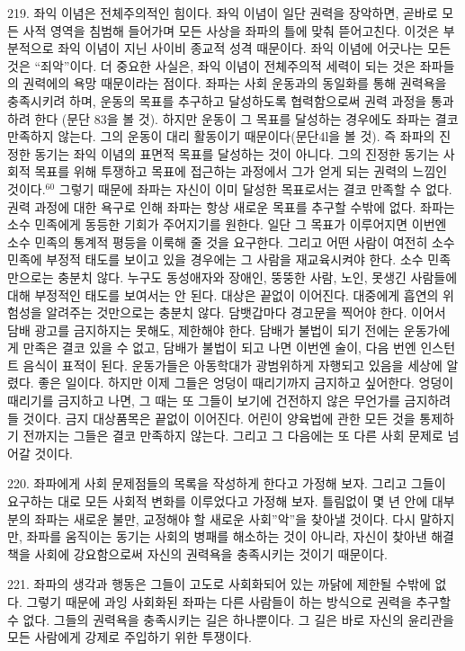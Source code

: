 \documentclass[11pt,a4paper]{article}
\begin{document}
\begin{multicols}{2}
219. 좌익 이념은 전체주의적인 힘이다. 좌익 이념이 일단 권력을 장악하면, 곧바로 모든 사적 영역을  침범해 들어가며 모든 사상을 좌파의 틀에 맞춰 뜯어고친다. 이것은 부분적으로 좌익 이념이 지닌 사이비  종교적 성격 때문이다. 좌익 이념에 어긋나는 모든 것은 “죄악”이다. 더 중요한 사실은, 좌익 이념이  전체주의적 세력이 되는 것은 좌파들의 권력에의 욕망 때문이라는 점이다. 좌파는 사회 운동과의  동일화를 통해 권력욕을 충족시키려 하며, 운동의 목표를 추구하고 달성하도록 협력함으로써 권력  과정을 통과하려 한다 (문단 83을 볼 것). 하지만 운동이 그 목표를 달성하는 경우에도 좌파는 결코 만족하지 않는다. 그의 운동이 대리 활동이기 때문이다(문단4l을 볼 것). 즉 좌파의 진정한 동기는 좌익 이념의 표면적 목표를 달성하는 것이 아니다. 그의 진정한 동기는 사회적 목표를 위해 투쟁하고 목표에  접근하는 과정에서 그가 얻게 되는 권력의 느낌인 것이다.\hyperlink{60}{$^{60}$} 그렇기 때문에 좌파는 자신이 이미 달성한  목표로서는 결코 만족할 수 없다. 권력 과정에 대한 욕구로 인해 좌파는 항상 새로운 목표를 추구할  수밖에 없다. 좌파는 소수 민족에게 동등한 기회가 주어지기를 원한다. 일단 그 목표가 이루어지면 이번엔 소수 민족의 통계적 평등을 이룩해 줄 것을 요구한다. 그리고 어떤 사람이 여전히 소수 민족에 부정적  태도를 보이고 있을 경우에는 그 사람을 재교육시켜야 한다. 소수 민족만으로는 충분치 않다. 누구도  동성애자와 장애인, 뚱뚱한 사람, 노인, 못생긴 사람들에 대해 부정적인 태도를 보여서는 안 된다. 대상은  끝없이 이어진다. 대중에게 흡연의 위험성을 알려주는 것만으로는 충분치 않다. 담뱃갑마다 경고문을  찍어야 한다. 이어서 담배 광고를 금지하지는 못해도, 제한해야 한다. 담배가 불법이 되기 전에는  운동가에게 만족은 결코 있을 수 없고, 담배가 불법이 되고 나면 이번엔 술이, 다음 번엔 인스턴트 음식이  표적이 된다. 운동가들은 아동학대가 광범위하게 자행되고 있음을 세상에 알렸다. 좋은 일이다. 하지만  이제 그들은 엉덩이 때리기까지 금지하고 싶어한다. 엉덩이 때리기를 금지하고 나면, 그 때는 또 그들이  보기에 건전하지 않은 무언가를 금지하려 들 것이다. 금지 대상품목은 끝없이 이어진다. 어린이 양육법에  관한 모든 것을 통제하기 전까지는 그들은 결코 만족하지 않는다. 그리고 그 다음에는 또 다른 사회  문제로 넘어갈 것이다.  


220. 좌파에게 사회 문제점들의 목록을 작성하게 한다고 가정해 보자. 그리고 그들이 요구하는 대로 모든 사회적 변화를 이루었다고 가정해 보자. 틀림없이 몇 년 안에 대부분의 좌파는 새로운 불만, 교정해야 할  새로운 사회”악”을 찾아낼 것이다. 다시 말하지만, 좌파를 움직이는 동기는 사회의 병패를 해소하는 것이  아니라, 자신이 찾아낸 해결책을 사회에 강요함으로써 자신의 권력욕을 충족시키는 것이기 때문이다. 


221. 좌파의 생각과 행동은 그들이 고도로 사회화되어 있는 까닭에 제한될 수밖에 없다. 그렇기 때문에  과잉 사회화된 좌파는 다른 사람들이 하는 방식으로 권력을 추구할 수 없다. 그들의 권력욕을 충족시키는  길은 하나뿐이다. 그 길은 바로 자신의 윤리관을 모든 사람에게 강제로 주입하기 위한 투쟁이다. 



\end{multicols}
\end{document}

